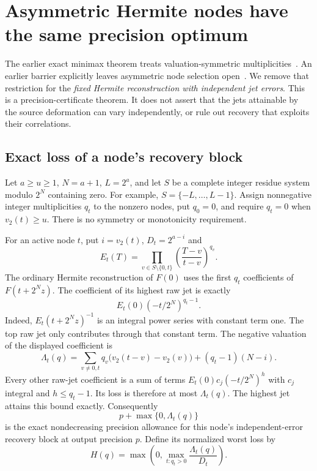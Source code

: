 \section{Asymmetric Hermite nodes have the same precision optimum}
\label{sec:asymmetric-hermite}

The earlier exact minimax theorem treats valuation-symmetric
multiplicities~\cite{precision}. An earlier barrier explicitly leaves
asymmetric node selection open~\cite{analysis}. We remove that restriction
for the \emph{fixed Hermite reconstruction with independent jet errors}.
This is a precision-certificate theorem. It does not assert that the
jets attainable by the source deformation can vary independently, or
rule out recovery that exploits their correlations.

\subsection{Exact loss of a node's recovery block}

Let $a\ge u\ge1$, $N=a+1$, $L=2^a$, and let $S$ be a complete
integer residue system modulo $2^N$ containing zero. For example,
$S=\{-L,\ldots,L-1\}$. Assign nonnegative integer multiplicities
$q_t$ to the nonzero nodes, put $q_0=0$, and require $q_t=0$ when
$v_2(t)\ge u$. There is no symmetry or monotonicity requirement.

For an active node $t$, put $i=v_2(t)$, $D_t=2^{a-i}$ and
\[
 E_t(T)=\prod_{v\in S\setminus\{0,t\}}
       \left(\frac{T-v}{t-v}\right)^{q_v}.
\]
The ordinary Hermite reconstruction of $F(0)$ uses the first $q_t$
coefficients of $F(t+2^Nz)$. The coefficient of its highest raw jet is
exactly
\[
 E_t(0)(-t/2^N)^{q_t-1}.
\]
Indeed, $E_t(t+2^Nz)^{-1}$ is an integral power series with constant
term one. The top raw jet only contributes through that constant term.
The negative valuation of the displayed coefficient is
\begin{equation}\label{eq:lambda-node}
 \Lambda_t(q)=
 \sum_{v\ne0,t}q_v\bigl(v_2(t-v)-v_2(v)\bigr)
 +(q_t-1)(N-i).
\end{equation}
Every other raw-jet coefficient is a sum of terms
$E_t(0)c_j(-t/2^N)^h$ with $c_j$ integral and $h\le q_t-1$.
Its loss is therefore at most $\Lambda_t(q)$. The highest jet attains
this bound exactly. Consequently
\[
 p+\max\{0,\Lambda_t(q)\}
\]
is the exact nondecreasing precision allowance for this node's
independent-error recovery block at output precision $p$.
Define its normalized worst loss by
\begin{equation}\label{eq:H-objective}
 H(q)=\max\left(0,\max_{t:q_t>0}\frac{\Lambda_t(q)}{D_t}\right).
\end{equation}

